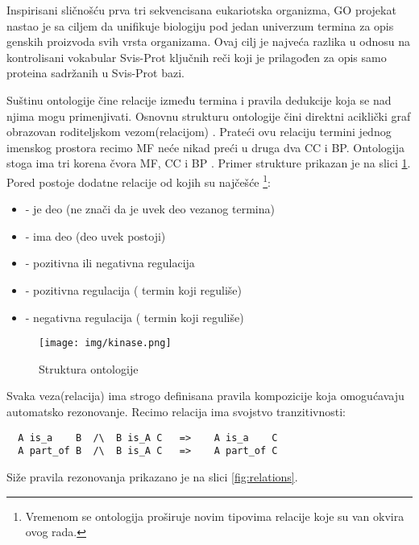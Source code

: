 Inspirisani sličnošću prva tri sekvencisana eukariotska organizma, GO projekat
nastao je sa ciljem da  unifikuje biologiju pod jedan univerzum termina za opis
genskih proizvoda svih vrsta organizama\parencite{GO2000}. Ovaj cilj je najveća
razlika u odnosu na kontrolisani vokabular Svis-Prot ključnih reči koji je
prilagođen za opis samo proteina sadržanih u Svis-Prot bazi.

Suštinu ontologije čine relacije između termina i pravila dedukcije koja se nad
njima mogu primenjivati. Osnovnu strukturu ontologije čini direktni aciklički
graf  obrazovan roditeljskom vezom(relacijom) . Prateći
ovu relaciju termini jednog imenskog prostora recimo MF neće nikad preći u
druga dva CC i BP.  Ontologija stoga ima tri korena čvora MF, CC i BP
\parencite{go_struktura}. Primer strukture prikazan je na
slici \ref{fig:kinase}.  Pored  postoje dodatne relacije od kojih
su najčešće \footnote{Vremenom se ontologija proširuje novim tipovima relacije
koje su van okvira ovog rada.}:

\begin{itemize}
  \item {}  - je deo  (ne znači da je uvek deo vezanog termina)
  \item {} - ima deo (deo uvek postoji)
  \item {} - pozitivna ili negativna regulacija
  \item {} - pozitivna regulacija  
    ( termin koji reguliše)
  \item {} - negativna regulacija 
    ( termin koji reguliše)
\end{itemize}

\begin{figure}[h!]
  \centering
  \texttt{[image: img/kinase.png]}
  \caption{Struktura ontologije}
  \label{fig:kinase}
\end{figure}

Svaka veza(relacija) ima strogo definisana pravila kompozicije koja omogućavaju
automatsko rezonovanje. Recimo relacija  ima svojstvo
tranzitivnosti\parencite{is_a}:
\begin{verbatim}
  A is_a    B  /\  B is_A C   =>    A is_a    C           
  A part_of B  /\  B is_A C   =>    A part_of C
\end{verbatim}

Siže pravila rezonovanja prikazano je na slici \ref{fig:relations}.

